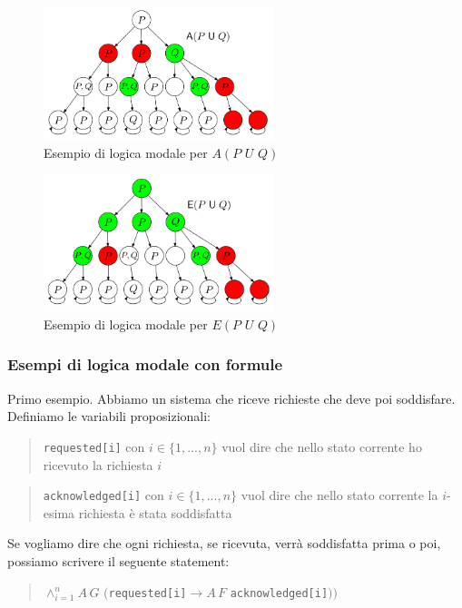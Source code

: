 \documentclass{article}
\begin{document}
\begin{figure}[!ht]
    \centering
    \includegraphics[width=0.6\textwidth]{apuq.png}
    \caption{Esempio di logica modale per $A(P\,\,U\,\,Q)$}
    \label{fig:exp}
\end{figure}


\begin{figure}[!ht]
    \centering
    \includegraphics[width=0.6\textwidth]{epuq.png}
    \caption{Esempio di logica modale per $E(P\,\,U\,\,Q)$}
    \label{fig:exp}
\end{figure}


\newpage

\subsubsection{Esempi di logica modale con formule}

Primo esempio. Abbiamo un sistema che riceve richieste che deve poi soddisfare. Definiamo le variabili proposizionali:
\begin{quote}
    \verb|requested[i]| con $i\in\{1,...,n\}$ vuol dire che nello stato corrente ho ricevuto la richiesta $i$
\end{quote}
\begin{quote}
    \verb|acknowledged[i]| con $i\in\{1,...,n\}$ vuol dire che nello stato corrente la $i$-esima richiesta è stata soddisfatta
\end{quote}

\bigskip 

Se vogliamo dire che ogni richiesta, se ricevuta, verrà soddisfatta prima o poi, possiamo scrivere il seguente statement:
\begin{quote}
    $\land_{i=1}^n A\,G\,\,($\verb|requested[i]|$\to A\,F\,\,$\verb|acknowledged[i]|$))$
\end{quote}
\end{document}

